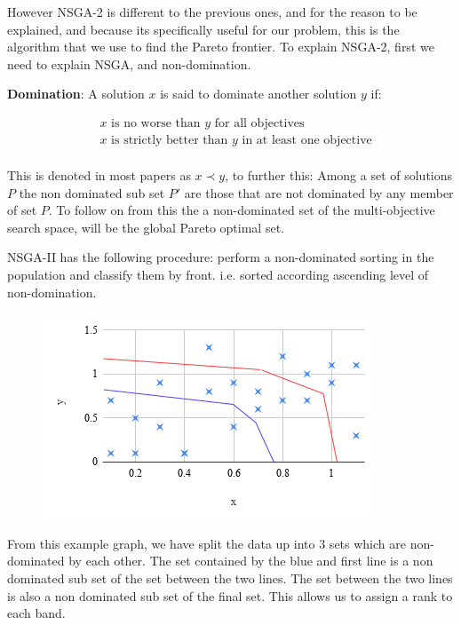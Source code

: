 \documentclass[11pt]{article}
\begin{document}
    However NSGA-2 is different to the previous ones, and for the reason to be explained,
    and because its specifically useful for our problem, this is the algorithm that
    we use to find the Pareto frontier. To explain NSGA-2, first we need to explain
    NSGA, and non-domination.

    \textbf{Domination}: A solution \(x\) is said to dominate another solution \(y\) if:

    \begin{align*}
        & x \text{ is no worse than } y \text{ for all objectives} \\
        & x \text{ is strictly better than } y \text{ in at least one objective} \\
    \end{align*}

    This is denoted in most papers as \(x \prec y\), to further this: Among a set of solutions \(P\)
    the non dominated sub set \(P'\) are those that are not dominated by any member of
    set \(P\). To follow on from this the a non-dominated set of the multi-objective search
    space, will be the global Pareto optimal set.

    NSGA-II has the following procedure: perform a non-dominated sorting in the population
    and classify them by front. i.e. sorted according ascending level of non-domination.

    \begin{figure}[H]
        \includegraphics{NSGArank}
    \end{figure}
    From this example graph, we have split the data up into 3 sets which are non-dominated
    by each other. The set contained by the blue and first line is a non dominated sub set
    of the set between the two lines. The set between the two lines is also a non dominated
    sub set of the final set. This allows us to assign a rank to each band.
\end{document}
